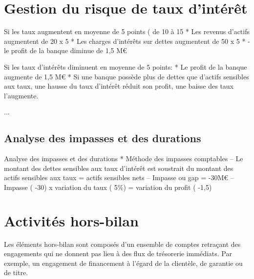 \section{Gestion du risque de taux d'intérêt}

Si les taux augmentent en moyenne de 5 points ( de 10 à 15%
* Les revenus d’actifs augmentent de 20 x 5%
* Les charges d’intérêts sur dettes augmentent de 50 x 5%
* - le profit de la banque diminue de 1,5 M\euro 

Si les taux d’intérêts diminuent en moyenne de 5 points: 
* Le profit de la banque augmente de 1,5 M\euro
* Si une banque possède plus de dettes que d’actifs sensibles aux taux, une 
hausse du taux d’intérêt réduit son profit, une baisse des taux l’augmente.

...

\subsection{Analyse des impasses et des durations}

Analyse des impasses et des durations
* Méthode des impasses comptables 
– Le montant des dettes sensibles aux taux d’intérêt est soustrait du 
montant des actifs sensibles aux taux = actifs sensibles nets 
– Impasse ou gap = -30M\euro
– Impasse ( -30) x variation du taux ( 5\%) = variation du profit ( -1,5) 
	

\section{Activités hors-bilan}

Les éléments hors-bilan sont composés d'un ensemble de comptes retraçant des engagements qui ne donnent pas lieu à des flux de trésorerie immédiats. Par exemple, un engagement de financement à l'égard de la clientèle, de garantie ou de titre.